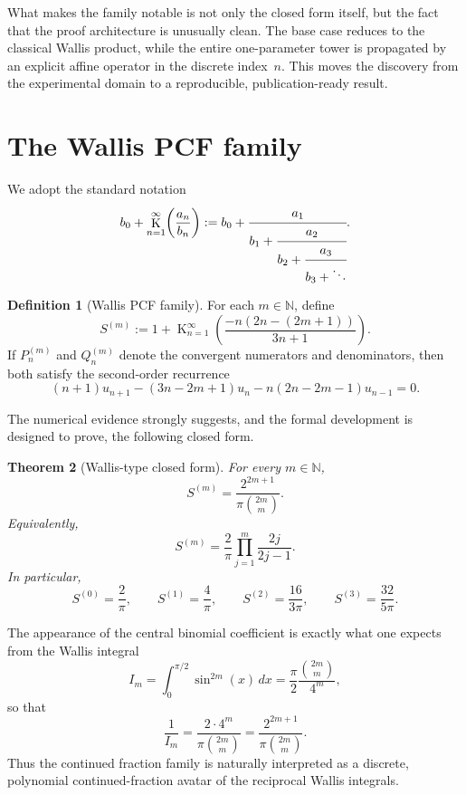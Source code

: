 \documentclass[11pt,reqno]{amsart}
\DeclareMathOperator{\Kop}{K}
\newcommand{\N}{\mathbb{N}}
\newcommand{\WallisValue}[1]{\frac{2^{2#1+1}}{\pi\binom{2#1}{#1}}}
\theoremstyle{plain}
\newtheorem{theorem}{Theorem}[section]
\theoremstyle{definition}
\newtheorem{definition}[theorem]{Definition}
\theoremstyle{remark}
\begin{document}
What makes the family notable is not only the closed form itself, but the fact that the proof architecture is unusually clean.  The base case reduces to the classical Wallis product, while the entire one-parameter tower is propagated by an explicit affine operator in the discrete index~$n$.  This moves the discovery from the experimental domain to a reproducible, publication-ready result.

\section{The Wallis PCF family}

We adopt the standard notation
\[
  b_0 + \Kop_{n=1}^{\infty}\!\left(\frac{a_n}{b_n}\right)
  := b_0 + \cfrac{a_1}{b_1 + \cfrac{a_2}{b_2 + \cfrac{a_3}{b_3 + \ddots}}}.
\]

\begin{definition}[Wallis PCF family]
For each $m \in \N$, define
\begin{equation}\label{eq:wallis-pcf}
  S^{(m)} := 1 + \Kop_{n=1}^{\infty}\!\left(\frac{-n(2n-(2m+1))}{3n+1}\right).
\end{equation}
If $P_n^{(m)}$ and $Q_n^{(m)}$ denote the convergent numerators and denominators, then both satisfy the second-order recurrence
\begin{equation}\label{eq:raw-recurrence}
  (n+1)u_{n+1} - (3n-2m+1)u_n - n(2n-2m-1)u_{n-1} = 0.
\end{equation}
\end{definition}

The numerical evidence strongly suggests, and the formal development is designed to prove, the following closed form.

\begin{theorem}[Wallis-type closed form]\label{thm:main}
For every $m \in \N$,
\begin{equation}\label{eq:main-closed-form}
  S^{(m)} = \WallisValue{m}.
\end{equation}
Equivalently,
\[
  S^{(m)} = \frac{2}{\pi}\prod_{j=1}^{m}\frac{2j}{2j-1}.
\]
In particular,
\[
  S^{(0)} = \frac{2}{\pi}, \qquad
  S^{(1)} = \frac{4}{\pi}, \qquad
  S^{(2)} = \frac{16}{3\pi}, \qquad
  S^{(3)} = \frac{32}{5\pi}.
\]
\end{theorem}

The appearance of the central binomial coefficient is exactly what one expects from the Wallis integral
\[
  I_m = \int_0^{\pi/2} \sin^{2m}(x)\,dx
      = \frac{\pi}{2}\frac{\binom{2m}{m}}{4^m},
\]
so that
\[
  \frac{1}{I_m} = \frac{2\cdot 4^m}{\pi\binom{2m}{m}} = \WallisValue{m}.
\]
Thus the continued fraction family is naturally interpreted as a discrete, polynomial continued-fraction avatar of the reciprocal Wallis integrals.
\end{document}
